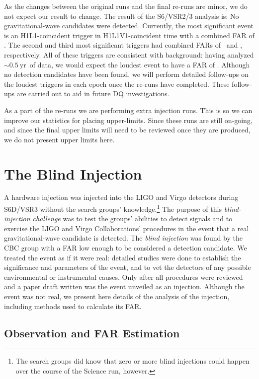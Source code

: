 As the changes between the original runs and the final re-runs are minor, we do
not expect our result to change. The result of the S6/VSR2/3 analysis is: No
gravitational-wave candidates were detected. Currently, the most significant
event is an H1L1-coincident trigger in H1L1V1-coincident time with a combined
FAR of \firstFAR. The second and third most significant triggers had combined
FARs of \secondFAR~and \thirdFAR, respectively. All of these triggers are
consistent with background: having analyzed $\mathrm{\sim0.5~yr}$~of data, we
would expect the loudest event to have a FAR of \expectedLoudestFAR. Although
no detection candidates have been found, we will perform detailed follow-ups on
the loudest triggers in each epoch once the re-runs have completed. These
follow-ups are carried out to aid in future \ac{DQ} investigations.

As a part of the re-runs we are performing extra injection runs. This is so we
can improve our statistics for placing upper-limits. Since these runs are still
on-going, and since the final upper limits will need to be reviewed once they
are produced, we do not present upper limits here.

\section{The Blind Injection}
\label{sec:s6_results_and_big_dog}

A hardware injection was injected into the \ac{LIGO} and Virgo detectors during
S6D/VSR3 without the search groups' knowledge.\footnote{The search groups did
know that zero or more blind injections could happen over the course of
the Science run, however.} The purpose of this \emph{blind-injection challenge}
was to test the groups' abilities to detect signals and to exercise the LIGO
and Virgo Collaborations' procedures in the event that a real
gravitational-wave candidate is detected. The {\it blind injection} was found
by the \ac{CBC} group with a FAR low enough to be considered a detection
candidate. We treated the event as if it were real: detailed studies were done
to establish the significance and parameters of the event, and to vet the
detectors of any possible environmental or instrumental causes. Only after all
procedures were reviewed and a paper draft written was the event unveiled as an
injection.  Although the event was not real, we present here details of the
analysis of the injection, including methods used to calculate its \ac{FAR}.

\subsection{Observation and FAR Estimation}

